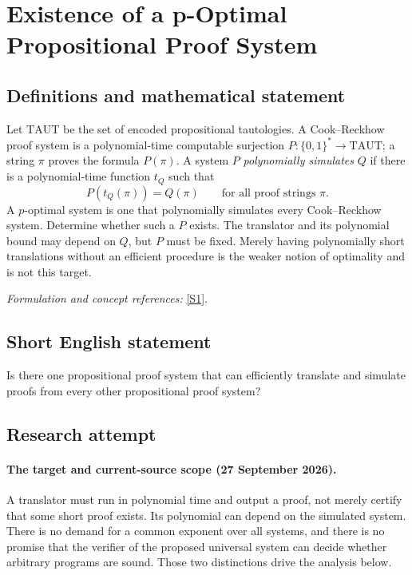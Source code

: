 \documentclass[11pt]{article}
\begin{document}
\section*{\texorpdfstring{Existence of a p-Optimal Propositional Proof System}{Existence of a p-Optimal Propositional Proof System}}\label{statement}
\subsection{Definitions and mathematical statement}
Let $\mathrm{TAUT}$ be the set of encoded propositional tautologies. A Cook--Reckhow proof system is a polynomial-time computable surjection $P:\{0,1\}^*\to\mathrm{TAUT}$; a string $\pi$ proves the formula $P(\pi)$. A system $P$ \emph{polynomially simulates} $Q$ if there is a polynomial-time function $t_Q$ such that
\[
 P(t_Q(\pi))=Q(\pi)\qquad\text{for all proof strings }\pi.
\]
A $p$-optimal system is one that polynomially simulates every Cook--Reckhow system. Determine whether such a $P$ exists. The translator and its polynomial bound may depend on $Q$, but $P$ must be fixed. Merely having polynomially short translations without an efficient procedure is the weaker notion of optimality and is not this target.
\par\smallskip\textit{Formulation and concept references:} \href{https://eccc.weizmann.ac.il/eccc-reports/1997/TR97-026/index.html}{[S1]}.

\subsection{Short English statement}
Is there one propositional proof system that can efficiently translate and simulate proofs from every other propositional proof system?
\subsection{Research attempt}
\paragraph{The target and current-source scope (27 September 2026).}
A translator must run in polynomial time and output a proof, not merely
certify that some short proof exists. Its polynomial can depend on the
simulated system. There is no demand for a common exponent over all
systems, and there is no promise that the verifier of the proposed
universal system can decide whether arbitrary programs are sound.
Those two distinctions drive the analysis below.
\end{document}
